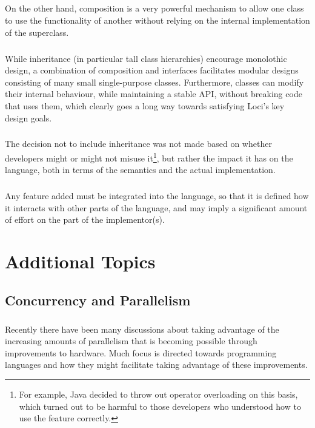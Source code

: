 \documentclass[12pt,twoside,notitlepage]{report}
\begin{document}
\paragraph{}
On the other hand, composition is a very powerful mechanism to allow one class to use the functionality of another without relying on the internal implementation of the superclass.

\paragraph{}
While inheritance (in particular tall class hierarchies) encourage monolothic design, a combination of composition and interfaces facilitates modular designs consisting of many small single-purpose classes. Furthermore, classes can modify their internal behaviour, while maintaining a stable API, without breaking code that uses them, which clearly goes a long way towards satisfying Loci's key design goals.

\paragraph{}
The decision not to include inheritance was not made based on whether developers might or might not misuse it\footnote{For example, Java decided to throw out operator overloading on this basis, which turned out to be harmful to those developers who understood how to use the feature correctly.}, but rather the impact it has on the language, both in terms of the semantics and the actual implementation.

\paragraph{}
Any feature added must be integrated into the language, so that it is defined how it interacts with other parts of the language, and may imply a significant amount of effort on the part of the implementor(s).

\cleardoublepage

\chapter{Additional Topics}

\section{Concurrency and Parallelism}

\paragraph{}
Recently there have been many discussions about taking advantage of the increasing amounts of parallelism that is becoming possible through improvements to hardware. Much focus is directed towards programming languages and how they might facilitate taking advantage of these improvements.
\end{document}
